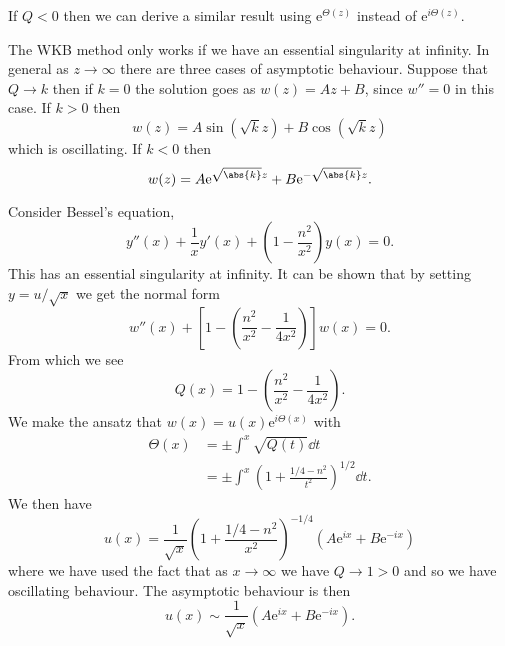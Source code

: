 \documentclass[fleqn]{NotesClass}
\newcommand*{\e}{\mathrm{e}}
\begin{document}
    If \(Q < 0\) then we can derive a similar result using \(\e^{\Theta(z)}\) instead of \(\e^{i\Theta(z)}\).
    
    The WKB method only works if we have an essential singularity at infinity.
    In general as \(z \to \infty\) there are three cases of asymptotic behaviour.
    Suppose that \(Q \to k\) then if \(k = 0\) the solution goes as \(w(z) = Az + B\), since \(w'' = 0\) in this case.
    If \(k > 0\) then
    \begin{equation}
        w(z) = A\sin(\sqrt{k}z) + B\cos(\sqrt{k}z)
    \end{equation}
    which is oscillating.
    If \(k < 0\) then
    \begin{equation}
        w(z) = A\e^{\sqrt{\abs{k}}z} + B\e^{-\sqrt{\abs{k}}z}.
    \end{equation}
    
    \begin{exm}{}{}
        Consider Bessel's equation,
        \begin{equation}
            y''(x) + \frac{1}{x}y'(x) + \left( 1 - \frac{n^2}{x^2} \right)y(x) = 0.
        \end{equation}
        This has an essential singularity at infinity.
        It can be shown that by setting \(y = u/\sqrt{x}\) we get the normal form
        \begin{equation}
            w''(x) + \left[ 1 - \left( \frac{n^2}{x^2} - \frac{1}{4x^2} \right) \right]w(x) = 0.
        \end{equation}
        From which we see
        \begin{equation}
            Q(x) = 1 - \left( \frac{n^2}{x^2} - \frac{1}{4x^2} \right).
        \end{equation}
        We make the ansatz that \(w(x) = u(x)\e^{i\Theta(x)}\) with
        \begin{align}
            \Theta(x) &= \pm \int^x \sqrt{Q(t)}\dd{t}\\
            &= \pm \int^x \left( 1 + \frac{1/4 - n^2}{t^2} \right)^{1/2} \dd{t}.
        \end{align}
        We then have
        \begin{equation}
            u(x) = \frac{1}{\sqrt{x}} \left( 1 + \frac{1/4 - n^2}{x^2} \right)^{-1/4}(A\e^{ix} + B\e^{-ix})
        \end{equation}
        where we have used the fact that as \(x \to \infty\) we have \(Q \to 1 > 0\) and so we have oscillating behaviour.
        The asymptotic behaviour is then
        \begin{equation}
            u(x) \sim \frac{1}{\sqrt{x}} (A\e^{ix} + B\e^{-ix}).
        \end{equation}
    \end{exm}
    
\end{document}
